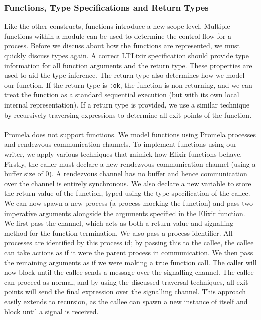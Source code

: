 \subsubsection{Functions, Type Specifications and Return Types}
Like the other constructs, functions introduce a new scope level. Multiple functions within a module can be used to determine the control flow for a process. Before we discuss about how the functions are represented, we must quickly discuss types again. A correct LTLixir specification should provide type information for all function arguments and the return type. These properties are used to aid the type inference. The return type also determines how we model our function. If the return type is \texttt{:ok}, the function is non-returning, and we can treat the function as a standard sequential execution (but with its own local internal representation). If a return type is provided, we use a similar technique by recursively traversing expressions to determine all exit points of the function. 
\\ \\
Promela does not support functions. We model functions using Promela processes and rendezvous communication channels. To implement functions using our writer, we apply various techniques that mimick how Elixir functions behave. Firstly, the caller must declare a new rendezvous communication channel (using a buffer size of 0). A rendezvous channel has no buffer and hence communication over the channel is entirely synchronous. We also declare a new variable to store the return value of the function, typed using the type specification of the callee. We can now spawn a new process (a process mocking the function) and pass two imperative arguments alongside the arguments specified in the Elixir function. We first pass the channel, which acts as both a return value and signalling method for the function termination. We also pass a process identifier. All processes are identified by this process id; by passing this to the callee, the callee can take actions as if it were the parent process in communication. We then pass the remaining arguments as if we were making a true function call. The caller will now block until the callee sends a message over the signalling channel. The callee can proceed as normal, and by using the discussed traversal techniques, all exit points will send the final expression over the signalling channel. This approach easily extends to recursion, as the callee can spawn a new instance of itself and block until a signal is received.
